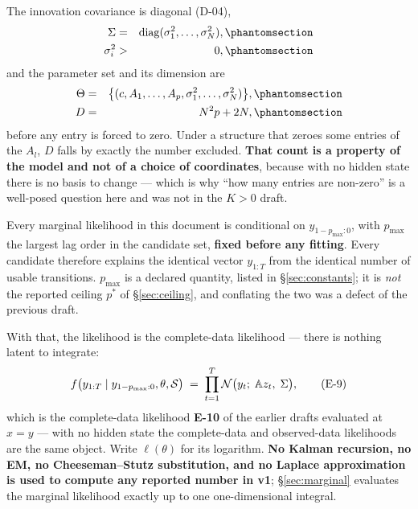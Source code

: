 The innovation covariance is diagonal (D-04),
\begin{eqnarray}
\Sigma &=& \operatorname{diag}(\sigma_1^2,\dots,\sigma_N^2),
  \Elabel{E-4A}{E4_A} \\
\sigma_i^2 &>& 0,
  \Elabel{E-4B}{E4_B}
\end{eqnarray}
and the parameter set and its dimension are
\begin{eqnarray}
\Theta &=& \bigl\{(c, A_1,\dots,A_p,\sigma_1^2,\dots,\sigma_N^2)\bigr\},
  \Elabel{E-5A}{E5_A} \\
D &=& N^2p+2N,
  \Elabel{E-5B}{E5_B}
\end{eqnarray}
before any entry is forced to zero. Under a structure that zeroes some entries of the
$A_l$, $D$ falls by exactly the number excluded. \textbf{That count is a property of
the model and not of a choice of coordinates}, because with no hidden state there is
no basis to change --- which is why ``how many entries are non-zero'' is a well-posed
question here and was not in the $K>0$ draft.

\begin{assumption}\label{ass:cond}
Every marginal likelihood in this document is conditional on $y_{1-p_{\max}:0}$, with
$p_{\max}$ the largest lag order in the candidate set, \textbf{fixed before any
fitting}. Every candidate therefore explains the identical vector $y_{1:T}$ from the
identical number of usable transitions. $p_{\max}$ is a declared quantity, listed in
\S\ref{sec:constants}; it is \emph{not} the reported ceiling $p^*$ of
\S\ref{sec:ceiling}, and conflating the two was a defect of the previous draft.
\end{assumption}

With that, the likelihood is the complete-data likelihood --- there is nothing latent
to integrate:
\begin{equation}
f\bigl(y_{1:T}\mid y_{1-p_{\max}:0},\theta,\mathcal{S}\bigr) \;=\;
\prod_{t=1}^{T}\mathcal{N}\bigl(y_t;\; \mathbb{A} z_t,\; \Sigma\bigr),
\tag{E-9}\label{E9}
\end{equation}
which is the complete-data likelihood \textbf{E-10} of the earlier drafts evaluated
at $x=y$ --- with no hidden state the complete-data and observed-data likelihoods are
the same object. Write $\ell(\theta)$ for its logarithm. \textbf{No Kalman recursion,
no EM, no Cheeseman--Stutz substitution, and no Laplace approximation is used to
compute any reported number in v1}; \S\ref{sec:marginal} evaluates the marginal
likelihood exactly up to one one-dimensional integral.

